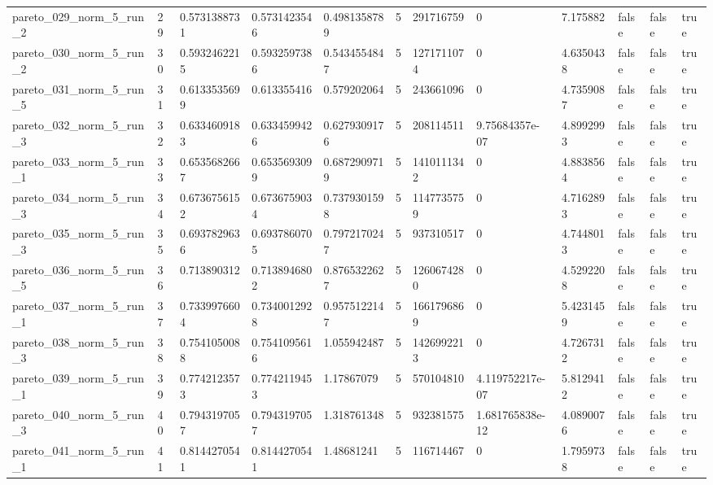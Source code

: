 \begin{tabular}{@{}llllllllllll@{}}
pareto\_029\_norm\_5\_run\_2 & 29 & 0.5731388731 & 0.5731423546 & 0.4981358789 & 5 & 291716759 & 0 & 7.175882 & false & false & true \\
pareto\_030\_norm\_5\_run\_2 & 30 & 0.5932462215 & 0.5932597386 & 0.5434554847 & 5 & 1271711074 & 0 & 4.6350438 & false & false & true \\
pareto\_031\_norm\_5\_run\_5 & 31 & 0.6133535699 & 0.613355416 & 0.579202064 & 5 & 243661096 & 0 & 4.7359087 & false & false & true \\
pareto\_032\_norm\_5\_run\_3 & 32 & 0.6334609183 & 0.6334599426 & 0.6279309176 & 5 & 208114511 & 9.75684357e-07 & 4.8992993 & false & false & true \\
pareto\_033\_norm\_5\_run\_1 & 33 & 0.6535682667 & 0.6535693099 & 0.6872909719 & 5 & 1410111342 & 0 & 4.8838564 & false & false & true \\
pareto\_034\_norm\_5\_run\_3 & 34 & 0.6736756152 & 0.6736759034 & 0.7379301598 & 5 & 1147735759 & 0 & 4.7162893 & false & false & true \\
pareto\_035\_norm\_5\_run\_3 & 35 & 0.6937829636 & 0.6937860705 & 0.7972170247 & 5 & 937310517 & 0 & 4.7448013 & false & false & true \\
pareto\_036\_norm\_5\_run\_5 & 36 & 0.713890312 & 0.7138946802 & 0.8765322627 & 5 & 1260674280 & 0 & 4.5292208 & false & false & true \\
pareto\_037\_norm\_5\_run\_1 & 37 & 0.7339976604 & 0.7340012928 & 0.9575122147 & 5 & 1661796869 & 0 & 5.4231459 & false & false & true \\
pareto\_038\_norm\_5\_run\_3 & 38 & 0.7541050088 & 0.7541095616 & 1.055942487 & 5 & 1426992213 & 0 & 4.7267312 & false & false & true \\
pareto\_039\_norm\_5\_run\_1 & 39 & 0.7742123573 & 0.7742119453 & 1.17867079 & 5 & 570104810 & 4.119752217e-07 & 5.8129412 & false & false & true \\
pareto\_040\_norm\_5\_run\_3 & 40 & 0.7943197057 & 0.7943197057 & 1.318761348 & 5 & 932381575 & 1.681765838e-12 & 4.0890076 & false & false & true \\
pareto\_041\_norm\_5\_run\_1 & 41 & 0.8144270541 & 0.8144270541 & 1.48681241 & 5 & 116714467 & 0 & 1.7959738 & false & false & true \\
\bottomrule
\end{tabular}
